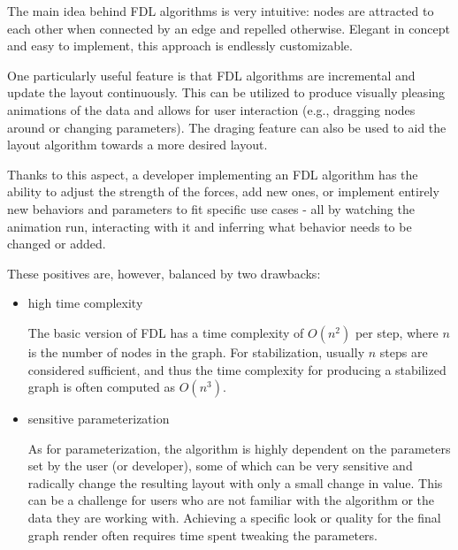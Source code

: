 The main idea behind FDL algorithms is very intuitive:
nodes are attracted to each other when connected by an edge and repelled otherwise.
Elegant in concept and easy to implement, this approach is endlessly customizable.

One particularly useful feature is that FDL algorithms are incremental and update the layout continuously.
This can be utilized to produce visually pleasing animations of the data and allows for user interaction
(e.g., dragging nodes around or changing parameters).
The draging feature can also be used to aid the layout algorithm towards a more desired layout.

Thanks to this aspect, a developer implementing an FDL algorithm has the ability to adjust the strength of the forces, add new ones,
or implement entirely new behaviors and parameters to fit specific use cases 
- all by watching the animation run, interacting with it and inferring what behavior needs to be changed or added.

These positives are, however, balanced by two drawbacks:
\begin{itemize}
    \item high time complexity

    The basic version of FDL has a time complexity of $O(n^2)$ per step, where $n$ is the number of nodes in the graph.
    For stabilization, usually $n$ steps are considered sufficient,
    and thus the time complexity for producing a stabilized graph is often computed as $O(n^3)$.

    \item sensitive parameterization
    
    As for parameterization, the algorithm is highly dependent on the parameters set by the user (or developer),
    some of which can be very sensitive and radically change the resulting layout with only a small change in value.
    This can be a challenge for users who are not familiar with the algorithm or the data they are working with.
    Achieving a specific look or quality for the final graph render often requires time spent tweaking the parameters.
\end{itemize}